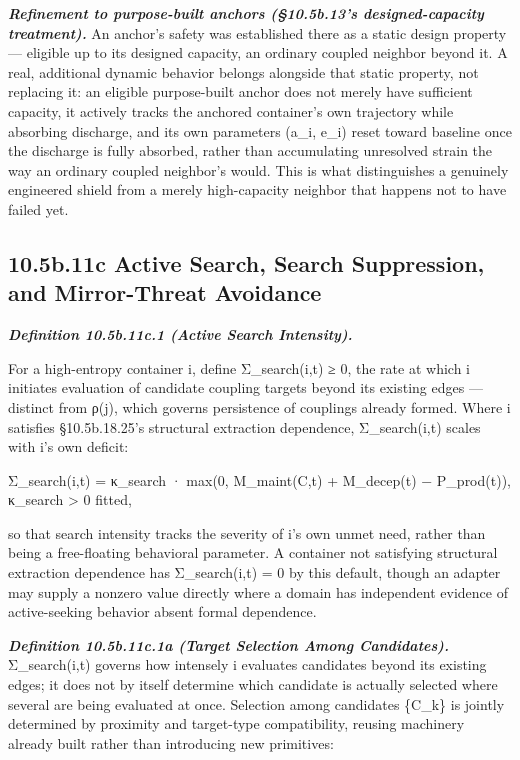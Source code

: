 \documentclass[
]{article}
\begin{document}
\emph{\textbf{Refinement to purpose-built anchors (§10.5b.13's
designed-capacity treatment).}} An anchor's safety was established there
as a static design property --- eligible up to its designed capacity, an
ordinary coupled neighbor beyond it. A real, additional dynamic behavior
belongs alongside that static property, not replacing it: an eligible
purpose-built anchor does not merely have sufficient capacity, it
actively tracks the anchored container's own trajectory while absorbing
discharge, and its own parameters (a\_i, e\_i) reset toward baseline
once the discharge is fully absorbed, rather than accumulating
unresolved strain the way an ordinary coupled neighbor's would. This is
what distinguishes a genuinely engineered shield from a merely
high-capacity neighbor that happens not to have failed yet.

\hypertarget{b.11c-active-search-search-suppression-and-mirror-threat-avoidance}{%
\subsection{10.5b.11c Active Search, Search Suppression, and
Mirror-Threat
Avoidance}\label{b.11c-active-search-search-suppression-and-mirror-threat-avoidance}}

\emph{\textbf{Definition 10.5b.11c.1 (Active Search Intensity).}}

For a high-entropy container i, define Σ\_search(i,t) ≥ 0, the rate at
which i initiates evaluation of candidate coupling targets beyond its
existing edges --- distinct from ρ(j), which governs persistence of
couplings already formed. Where i satisfies §10.5b.18.25's structural
extraction dependence, Σ\_search(i,t) scales with i's own deficit:

Σ\_search(i,t) = κ\_search · max(0, M\_maint(C,t) + M\_decep(t) −
P\_prod(t)), κ\_search \textgreater{} 0 fitted,

so that search intensity tracks the severity of i's own unmet need,
rather than being a free-floating behavioral parameter. A container not
satisfying structural extraction dependence has Σ\_search(i,t) = 0 by
this default, though an adapter may supply a nonzero value directly
where a domain has independent evidence of active-seeking behavior
absent formal dependence.

\emph{\textbf{Definition 10.5b.11c.1a (Target Selection Among
Candidates).}} Σ\_search(i,t) governs how intensely i evaluates
candidates beyond its existing edges; it does not by itself determine
which candidate is actually selected where several are being evaluated
at once. Selection among candidates \{C\_k\} is jointly determined by
proximity and target-type compatibility, reusing machinery already built
rather than introducing new primitives:
\end{document}
